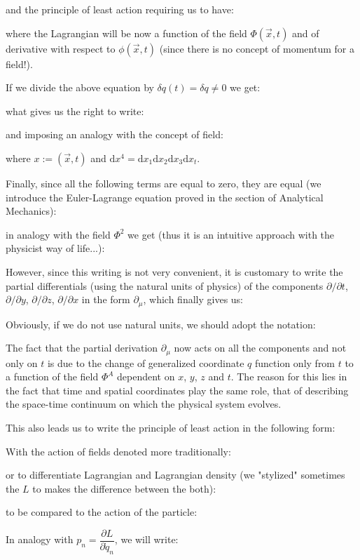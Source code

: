 	and the principle of least action requiring us to have:
	
	where the Lagrangian will be now a function of the field $\Phi(\vec{x},t)$ and of derivative with respect to $\phi(\vec{x},t)$ (since there is no concept of momentum for a field!).
	
	If we divide the above equation by $\delta q(t)=\delta q\neq 0$ we get:
	
	what gives us the right to write:
	
	and imposing an analogy with the concept of field:
	
	where $x:=(\vec{x},t)$ and $\mathrm{d}x^4=\mathrm{d}x_1\mathrm{d}x_2\mathrm{d}x_3\mathrm{d}x_t$.
	
	Finally, since all the following terms are equal to zero, they are equal (we introduce the Euler-Lagrange equation proved in the section of Analytical Mechanics):
	
	in analogy with the field $\Phi^2$ we get (thus it is an intuitive approach with the physicist way of life...):
	
	However, since this writing is not very convenient, it is customary to write the partial differentials (using the natural units of physics) of the components $\partial/\partial t$, $\partial/\partial y$, $\partial / \partial z$, $\partial / \partial x$ in the form $\partial_\mu$, which finally gives us:
	
	Obviously, if we do not use natural units, we should adopt the notation:
	
	The fact that the partial derivation $\partial_\mu$ now acts on all the components and not only on $t$ is due to the change of generalized coordinate $q$ function only from $t$ to a function of the field $\Phi^A$ dependent on $x$, $y$, $z$ and $t$. The reason for this lies in the fact that time and spatial coordinates play the same role, that of describing the space-time continuum on which the physical system evolves.

	This also leads us to write the principle of least action in the following form:
	
	With the action of fields denoted more traditionally:
	
	or to differentiate Lagrangian and Lagrangian density \label{lagrangian density} (we "stylized" sometimes the $L$ to makes the difference between the both):
	
	to be compared to the action of the particle:
	
	In analogy with $p_n=\dfrac{\partial L}{\partial \dot{q}_n}$, we will write:
	
